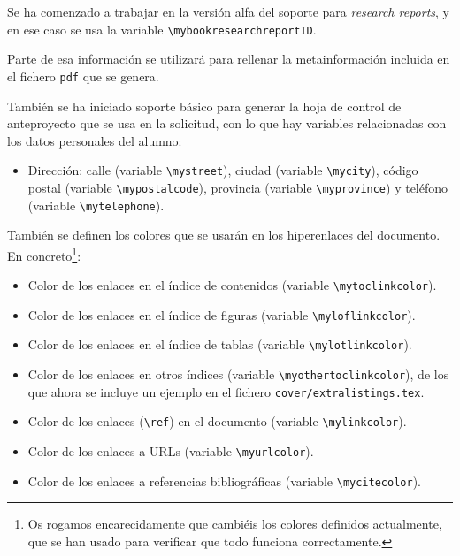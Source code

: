 Se ha comenzado a trabajar en la versión alfa del soporte para
\textit{research reports}, y en ese caso se usa la variable
\texttt{\textbackslash{}mybookresearchreportID}.

Parte de esa información se utilizará para rellenar la metainformación
incluida en el fichero \texttt{pdf} que se genera.

También se ha iniciado soporte básico para generar la hoja de control de
anteproyecto que se usa en la solicitud, con lo que hay variables
relacionadas con los datos personales del alumno:

\begin{itemize}
\item Dirección: calle (variable \texttt{\textbackslash{}mystreet}),
  ciudad (variable \texttt{\textbackslash{}mycity}), código postal
  (variable \texttt{\textbackslash{}mypostalcode}), provincia (variable
  \texttt{\textbackslash{}myprovince}) y teléfono (variable
  \texttt{\textbackslash{}mytelephone}).
\end{itemize}

También se definen los colores que se usarán en los hiperenlaces del
documento. En concreto\footnote{Os rogamos encarecidamente que cambiéis
  los colores definidos actualmente, que se han usado para verificar que
  todo funciona correctamente.}:

\begin{itemize}
\item Color de los enlaces en el índice de contenidos (variable
  \texttt{\textbackslash{}mytoclinkcolor}).
\item Color de los enlaces en el índice de figuras (variable
  \texttt{\textbackslash{}myloflinkcolor}).
\item Color de los enlaces en el índice de tablas (variable
  \texttt{\textbackslash{}mylotlinkcolor}).
\item Color de los enlaces en otros índices (variable
  \texttt{\textbackslash{}myothertoclinkcolor}), de los que ahora se
  incluye un ejemplo en el fichero \texttt{cover/extralistings.tex}.
\item Color de los enlaces (\texttt{\textbackslash{}ref}) en el
  documento (variable \texttt{\textbackslash{}mylinkcolor}).
\item Color de los enlaces a URLs (variable
  \texttt{\textbackslash{}myurlcolor}).
\item Color de los enlaces a referencias bibliográficas (variable
  \texttt{\textbackslash{}mycitecolor}).
\end{itemize}

